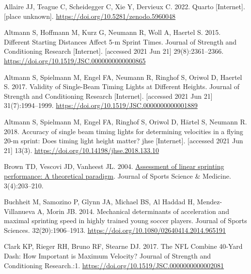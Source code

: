 \documentclass[
  letterpaper,
  DIV=11,
  numbers=noendperiod]{scrartcl}
\newlength{\cslhangindent}
\newlength{\cslentryspacingunit} %
\newenvironment{CSLReferences}[2] %
 {%
  \setlength{\parindent}{0pt}
  \ifodd #1
  \let\oldpar\par
  \def\par{\hangindent=\cslhangindent\oldpar}
  \fi
  \setlength{\parskip}{#2\cslentryspacingunit}
 }%
 {}
\begin{document}
\hypertarget{refs}{}
\begin{CSLReferences}{0}{0}
\leavevmode{}%
Allaire JJ, Teague C, Scheidegger C, Xie Y, Dervieux C. 2022. {Quarto}
{[}Internet{]}. {[}place unknown{]}.
\url{https://doi.org/10.5281/zenodo.5960048}

\leavevmode{}%
Altmann S, Hoffmann M, Kurz G, Neumann R, Woll A, Haertel S. 2015.
Different {Starting Distances Affect} 5-m {Sprint Times}. Journal of
Strength and Conditioning Research {[}Internet{]}. {[}accessed 2021 Jun
21{]} 29(8):2361--2366.
\url{https://doi.org/10.1519/JSC.0000000000000865}

\leavevmode{}%
Altmann S, Spielmann M, Engel FA, Neumann R, Ringhof S, Oriwol D,
Haertel S. 2017. Validity of {Single}-{Beam Timing Lights} at {Different
Heights}. Journal of Strength and Conditioning Research {[}Internet{]}.
{[}accessed 2021 Jun 21{]} 31(7):1994--1999.
\url{https://doi.org/10.1519/JSC.0000000000001889}

\leavevmode{}%
Altmann S, Spielmann M, Engel FA, Ringhof S, Oriwol D, Härtel S, Neumann
R. 2018. Accuracy of single beam timing lights for determining
velocities in a flying 20-m sprint: {Does} timing light height matter?
jhse {[}Internet{]}. {[}accessed 2021 Jun 21{]} 13(3).
\url{https://doi.org/10.14198/jhse.2018.133.10}

\leavevmode{}%
Brown TD, Vescovi JD, Vanheest JL. 2004.
\href{https://www.ncbi.nlm.nih.gov/pmc/articles/PMC3938058}{Assessment
of linear sprinting performance: A theoretical paradigm}. Journal of
Sports Science \& Medicine. 3(4):203--210.

\leavevmode{}%
Buchheit M, Samozino P, Glynn JA, Michael BS, Al Haddad H,
Mendez-Villanueva A, Morin JB. 2014. Mechanical determinants of
acceleration and maximal sprinting speed in highly trained young soccer
players. Journal of Sports Sciences. 32(20):1906--1913.
\url{https://doi.org/10.1080/02640414.2014.965191}

\leavevmode{}%
Clark KP, Rieger RH, Bruno RF, Stearne DJ. 2017. The {NFL Combine}
40-{Yard Dash}: {How Important} is {Maximum Velocity}? Journal of
Strength and Conditioning Research.:1.
\url{https://doi.org/10.1519/JSC.0000000000002081}


\end{CSLReferences}
\end{document}
